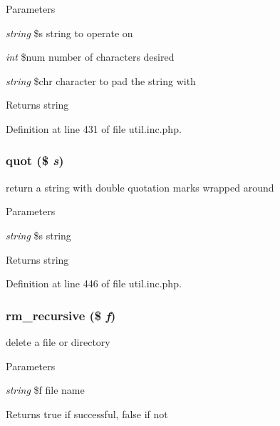 \begin{DoxyParams}{Parameters}
\item[{\em string}]\$s string to operate on \item[{\em int}]\$num number of characters desired \item[{\em string}]\$chr character to pad the string with \end{DoxyParams}
\begin{DoxyReturn}{Returns}
string 
\end{DoxyReturn}


Definition at line 431 of file util.inc.php.

\hypertarget{util_8inc_8php_a3c7d87c658499c1559a6b98cac06f58d}{
\subsubsection[{quot}]{\setlength{\rightskip}{0pt plus 5cm}quot (\$ {\em s})}}
\label{util_8inc_8php_a3c7d87c658499c1559a6b98cac06f58d}
return a string with double quotation marks wrapped around


\begin{DoxyParams}{Parameters}
\item[{\em string}]\$s string \end{DoxyParams}
\begin{DoxyReturn}{Returns}
string 
\end{DoxyReturn}


Definition at line 446 of file util.inc.php.

\hypertarget{util_8inc_8php_aea325eb074a103f961fdabadbc5e4fb6}{
\subsubsection[{rm\_\-recursive}]{\setlength{\rightskip}{0pt plus 5cm}rm\_\-recursive (\$ {\em f})}}
\label{util_8inc_8php_aea325eb074a103f961fdabadbc5e4fb6}
delete a file or directory


\begin{DoxyParams}{Parameters}
\item[{\em string}]\$f file name \end{DoxyParams}
\begin{DoxyReturn}{Returns}
true if successful, false if not 
\end{DoxyReturn}


